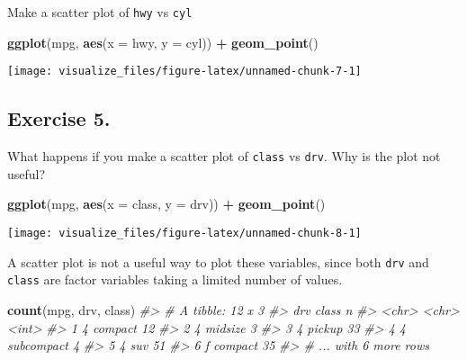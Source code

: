 \documentclass[]{book}
\newenvironment{Shaded}{\begin{snugshade}}{\end{snugshade}}
\newcommand{\CommentTok}[1]{\textcolor[rgb]{0.56,0.35,0.01}{\textit{#1}}}
\newcommand{\DataTypeTok}[1]{\textcolor[rgb]{0.13,0.29,0.53}{#1}}
\newcommand{\KeywordTok}[1]{\textcolor[rgb]{0.13,0.29,0.53}{\textbf{#1}}}
\newcommand{\NormalTok}[1]{#1}
\newcommand{\OperatorTok}[1]{\textcolor[rgb]{0.81,0.36,0.00}{\textbf{#1}}}
\newcommand{\StringTok}[1]{\textcolor[rgb]{0.31,0.60,0.02}{#1}}
\theoremstyle{definition}
\theoremstyle{definition}
\theoremstyle{definition}
\theoremstyle{remark}
\begin{document}
Make a scatter plot of \texttt{hwy} vs \texttt{cyl}

\begin{Shaded}
\begin{Highlighting}[]
\KeywordTok{ggplot}\NormalTok{(mpg, }\KeywordTok{aes}\NormalTok{(}\DataTypeTok{x =}\NormalTok{ hwy, }\DataTypeTok{y =}\NormalTok{ cyl)) }\OperatorTok{+}
\StringTok{  }\KeywordTok{geom_point}\NormalTok{()}
\end{Highlighting}
\end{Shaded}

\begin{center}\texttt{[image: visualize\_files/figure-latex/unnamed-chunk-7-1]} \end{center}

\hypertarget{exercise-5.}{%
\subsection{Exercise 5.}\label{exercise-5.}}

What happens if you make a scatter plot of \texttt{class} vs
\texttt{drv}. Why is the plot not useful?

\begin{Shaded}
\begin{Highlighting}[]
\KeywordTok{ggplot}\NormalTok{(mpg, }\KeywordTok{aes}\NormalTok{(}\DataTypeTok{x =}\NormalTok{ class, }\DataTypeTok{y =}\NormalTok{ drv)) }\OperatorTok{+}
\StringTok{  }\KeywordTok{geom_point}\NormalTok{()}
\end{Highlighting}
\end{Shaded}

\begin{center}\texttt{[image: visualize\_files/figure-latex/unnamed-chunk-8-1]} \end{center}

A scatter plot is not a useful way to plot these variables, since both
\texttt{drv} and \texttt{class} are factor variables taking a limited
number of values.

\begin{Shaded}
\begin{Highlighting}[]
\KeywordTok{count}\NormalTok{(mpg, drv, class)}
\CommentTok{#> # A tibble: 12 x 3}
\CommentTok{#>   drv   class          n}
\CommentTok{#>   <chr> <chr>      <int>}
\CommentTok{#> 1 4     compact       12}
\CommentTok{#> 2 4     midsize        3}
\CommentTok{#> 3 4     pickup        33}
\CommentTok{#> 4 4     subcompact     4}
\CommentTok{#> 5 4     suv           51}
\CommentTok{#> 6 f     compact       35}
\CommentTok{#> # ... with 6 more rows}
\end{Highlighting}
\end{Shaded}
\end{document}
